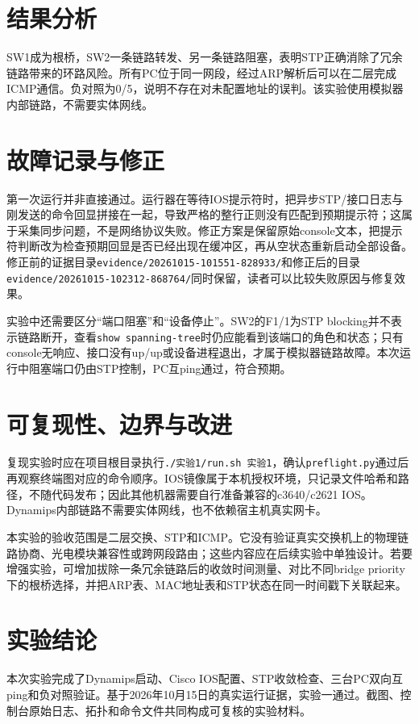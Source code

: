 \documentclass[UTF8,a4paper,12pt]{ctexart}
\begin{document}
\section{结果分析}
SW1成为根桥，SW2一条链路转发、另一条链路阻塞，表明STP正确消除了冗余链路带来的环路风险。所有PC位于同一网段，经过ARP解析后可以在二层完成ICMP通信。负对照为0/5，说明不存在对未配置地址的误判。该实验使用模拟器内部链路，不需要实体网线。
\section{故障记录与修正}
第一次运行并非直接通过。运行器在等待IOS提示符时，把异步STP/接口日志与刚发送的命令回显拼接在一起，导致严格的整行正则没有匹配到预期提示符；这属于采集同步问题，不是网络协议失败。修正方案是保留原始console文本，把提示符判断改为检查预期回显是否已经出现在缓冲区，再从空状态重新启动全部设备。修正前的证据目录\texttt{evidence/20261015-101551-828933/}和修正后的目录\texttt{evidence/20261015-102312-868764/}同时保留，读者可以比较失败原因与修复效果。

实验中还需要区分“端口阻塞”和“设备停止”。SW2的F1/1为STP blocking并不表示链路断开，查看\texttt{show spanning-tree}时仍应能看到该端口的角色和状态；只有console无响应、接口没有up/up或设备进程退出，才属于模拟器链路故障。本次运行中阻塞端口仍由STP控制，PC互ping通过，符合预期。
\section{可复现性、边界与改进}
复现实验时应在项目根目录执行\texttt{./实验1/run.sh 实验1}，确认\texttt{preflight.py}通过后再观察终端图对应的命令顺序。IOS镜像属于本机授权环境，只记录文件哈希和路径，不随代码发布；因此其他机器需要自行准备兼容的c3640/c2621 IOS。Dynamips内部链路不需要实体网线，也不依赖宿主机真实网卡。

本实验的验收范围是二层交换、STP和ICMP。它没有验证真实交换机上的物理链路协商、光电模块兼容性或跨网段路由；这些内容应在后续实验中单独设计。若要增强实验，可增加拔除一条冗余链路后的收敛时间测量、对比不同bridge priority下的根桥选择，并把ARP表、MAC地址表和STP状态在同一时间戳下关联起来。
\section{实验结论}
本次实验完成了Dynamips启动、Cisco IOS配置、STP收敛检查、三台PC双向互ping和负对照验证。基于2026年10月15日的真实运行证据，实验一通过。截图、控制台原始日志、拓扑和命令文件共同构成可复核的实验材料。
\end{document}

